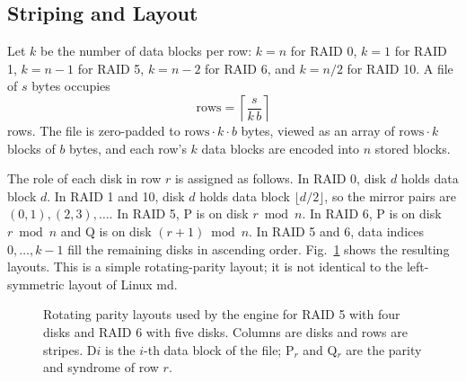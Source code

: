 \documentclass{ieeeaccess}
\begin{document}
\subsection{Striping and Layout}
Let $k$ be the number of data blocks per row: $k=n$ for RAID 0, $k=1$ for RAID 1, $k=n-1$ for RAID 5, $k=n-2$ for RAID 6, and $k=n/2$ for RAID 10. A file of $s$ bytes occupies \begin{equation} \text{rows} = \left\lceil \frac{s}{k\,b} \right\rceil \label{eq:rows} \end{equation} rows. The file is zero-padded to $\text{rows}\cdot k\cdot b$ bytes, viewed as an array of $\text{rows}\cdot k$ blocks of $b$ bytes, and each row's $k$ data blocks are encoded into $n$ stored blocks.

The role of each disk in row $r$ is assigned as follows. In RAID 0, disk $d$ holds data block $d$. In RAID 1 and 10, disk $d$ holds data block $\lfloor d/2 \rfloor$, so the mirror pairs are $(0,1), (2,3), \dots$. In RAID 5, P is on disk $r \bmod n$. In RAID 6, P is on disk $r \bmod n$ and Q is on disk $(r+1) \bmod n$. In RAID 5 and 6, data indices $0,\dots,k-1$ fill the remaining disks in ascending order. Fig.~\ref{fig:layout} shows the resulting layouts. This is a simple rotating-parity layout; it is not identical to the left-symmetric layout of Linux md.

\begin{figure}[!t]
\centering
{}
\caption{Rotating parity layouts used by the engine for RAID 5 with four disks and RAID 6 with five disks. Columns are disks and rows are stripes. D$i$ is the $i$-th data block of the file; P$_r$ and Q$_r$ are the parity and syndrome of row $r$.}
\label{fig:layout}
\end{figure}
\end{document}
